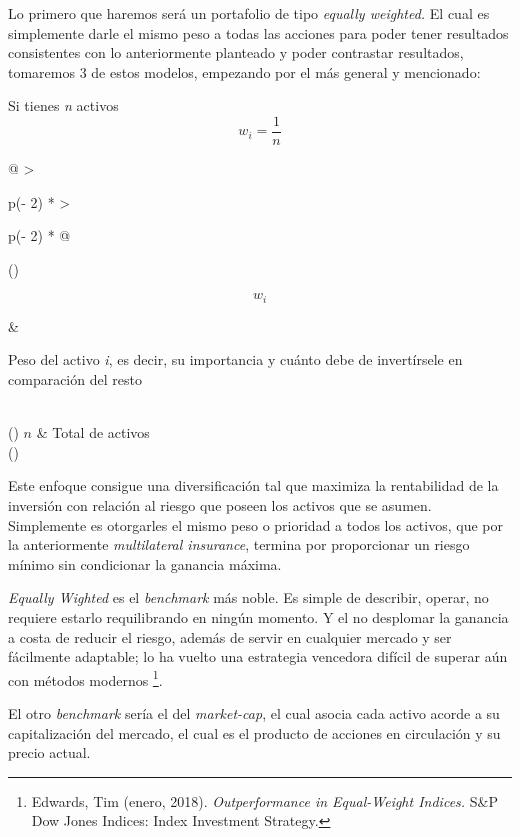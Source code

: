 \documentclass[
]{article}
\begin{document}
Lo primero que haremos será un portafolio de tipo \emph{equally
weighted.} El cual es simplemente darle el mismo peso a todas las
acciones para poder tener resultados consistentes con lo anteriormente
planteado y poder contrastar resultados, tomaremos 3 de estos modelos,
empezando por el más general y mencionado:

Si tienes \emph{n} activos
\begin{equation}
w_{i} = \frac{1}{n}   
\end{equation}

\begin{longtable}[]{@{}
>{\raggedright\arraybackslash}p{(\columnwidth - 2\tabcolsep) * }
>{\raggedright\arraybackslash}p{(\columnwidth - 2\tabcolsep) * }@{}}
\toprule()
\begin{minipage}[b]{\linewidth}\raggedright
\[w_{i}\]
\end{minipage} & \begin{minipage}[b]{\linewidth}\raggedright
Peso del activo \emph{i}, es decir, su importancia y cuánto debe de
invertírsele en comparación del resto
\end{minipage} \\
\midrule()
\endhead
\center\(n\) & Total de activos \\
\bottomrule()
\caption{Descripción de variables para realizar el \textit{benchmark equally weighted.}}
\end{longtable}

Este enfoque consigue una diversificación tal que maximiza la
rentabilidad de la inversión con relación al riesgo que poseen los
activos que se asumen. Simplemente es otorgarles el mismo peso o
prioridad a todos los activos, que por la anteriormente
\emph{multilateral insurance}, termina por proporcionar un riesgo mínimo
sin condicionar la ganancia máxima.

\emph{Equally Wighted} es el \emph{benchmark} más noble. Es simple de
describir, operar, no requiere estarlo requilibrando en ningún momento.
Y el no desplomar la ganancia a costa de reducir el riesgo, además de
servir en cualquier mercado y ser fácilmente adaptable; lo ha vuelto una
estrategia vencedora difícil de superar aún con métodos modernos 
\footnote{Edwards, Tim (enero, 2018). \emph{Outperformance in Equal-Weight Indices.}
S\&P Dow Jones Indices: Index Investment Strategy.}.

El otro \emph{benchmark} sería el del \emph{market-cap}, el cual asocia cada
activo acorde a su capitalización del mercado, el cual es el producto de
acciones en circulación y su precio actual.
\end{document}

